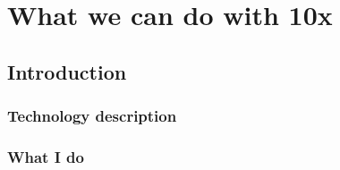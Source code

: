 \documentclass[main.tex]{subfiles}
\begin{document}
\chapter{What we can do with 10x}

\section{Introduction}

\subsection{Technology description}

\subsection{What I do}

\end{document}
